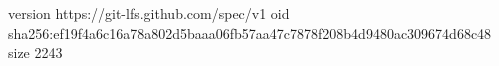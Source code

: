 version https://git-lfs.github.com/spec/v1
oid sha256:ef19f4a6c16a78a802d5baaa06fb57aa47c7878f208b4d9480ac309674d68c48
size 2243
